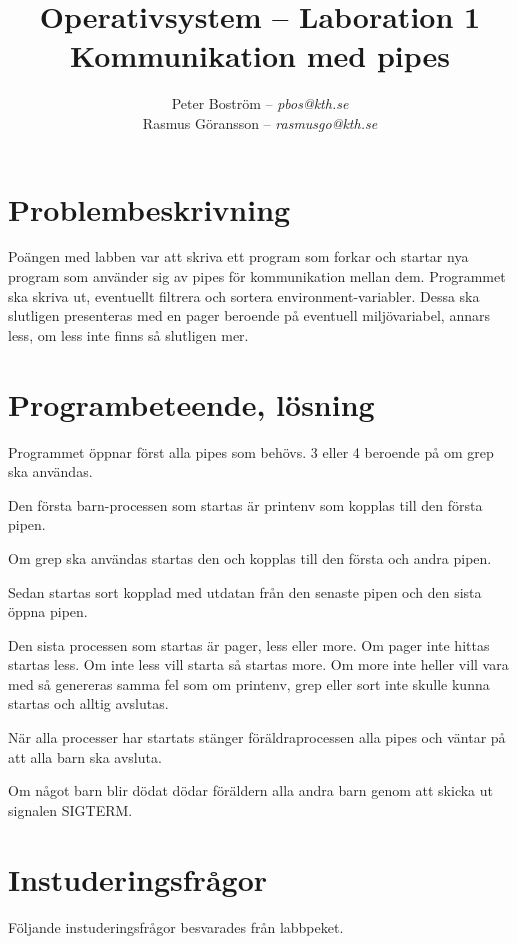 \documentclass[a4paper,11pt]{article}
\title{Operativsystem -- Laboration 1\\\vspace{4pt}\normalsize Kommunikation med pipes}
\author{Peter Boström -- \emph{pbos@kth.se}\\
	Rasmus Göransson -- \emph{rasmusgo@kth.se}}
\begin{document}
\maketitle
\pagestyle{fancyplain}

\section*{Problembeskrivning}

Poängen med labben var att skriva ett program som forkar och startar nya program som använder sig av pipes för kommunikation mellan dem. Programmet ska skriva ut, eventuellt filtrera och sortera environment-variabler. Dessa ska slutligen presenteras med en pager beroende på eventuell miljövariabel, annars less, om less inte finns så slutligen mer.

\section*{Programbeteende, lösning}

Programmet öppnar först alla pipes som behövs. 3 eller 4 beroende på om grep ska användas.

Den första barn-processen som startas är printenv som kopplas till den första pipen.

Om grep ska användas startas den och kopplas till den första och andra pipen.

Sedan startas sort kopplad med utdatan från den senaste pipen och den sista öppna pipen.

Den sista processen som startas är pager, less eller more. Om pager inte hittas startas less. Om inte less vill starta så startas more. Om more inte heller vill vara med så genereras samma fel som om printenv, grep eller sort inte skulle kunna startas och alltig avslutas.

När alla processer har startats stänger föräldraprocessen alla pipes och väntar på att alla barn ska avsluta.

Om något barn blir dödat dödar föräldern alla andra barn genom att skicka ut signalen SIGTERM.

\section*{Instuderingsfrågor}

Följande instuderingsfrågor besvarades från labbpeket.
\end{document}
